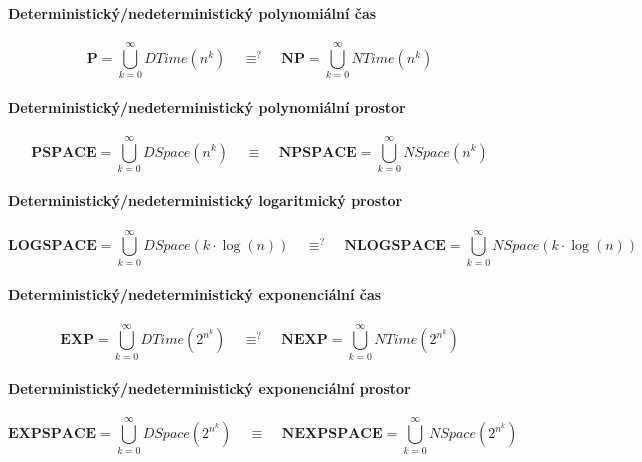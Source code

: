 \paragraph*{Deterministický/nedeterministický polynomiální čas} $$ \mathbf{P} = \bigcup_{k=0}^{\infty} DTime(n^k) ~~~~~ \equiv^? ~~~~~ \mathbf{NP} = \bigcup_{k=0}^{\infty} NTime(n^k) $$

\paragraph*{Deterministický/nedeterministický polynomiální prostor} $$ \mathbf{PSPACE} = \bigcup_{k=0}^{\infty} DSpace(n^k) ~~~~~ \equiv ~~~~~ \mathbf{NPSPACE} = \bigcup_{k=0}^{\infty} NSpace(n^k) $$

\paragraph*{Deterministický/nedeterministický logaritmický prostor} $$ \mathbf{LOGSPACE} = \bigcup_{k=0}^{\infty} DSpace(k \cdot \log(n)) ~~~~~ \equiv^? ~~~~~ \mathbf{NLOGSPACE} = \bigcup_{k=0}^{\infty} NSpace(k \cdot \log(n)) $$

\paragraph*{Deterministický/nedeterministický exponenciální čas} $$ \mathbf{EXP} = \bigcup_{k=0}^{\infty} DTime(2^{n^k}) ~~~~~ \equiv^? ~~~~~ \mathbf{NEXP} = \bigcup_{k=0}^{\infty} NTime(2^{n^k}) $$

\paragraph*{Deterministický/nedeterministický exponenciální prostor} $$ \mathbf{EXPSPACE} = \bigcup_{k=0}^{\infty} DSpace(2^{n^k}) ~~~~~ \equiv ~~~~~ \mathbf{NEXPSPACE} = \bigcup_{k=0}^{\infty} NSpace(2^{n^k}) $$
